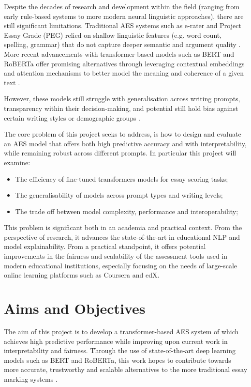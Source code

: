 \documentclass[10pt]{report}
\begin{document}
Despite the decades of research and development within the field (ranging from early rule-based systems to more modern neural linguistic approaches), there are still significant limitations\parencite{dikli2006}. Traditional AES systems such as e-rater \parencite{e-rater2006} and Project Essay Grade (PEG) \parencite{page2003} relied on shallow linguistic features (e.g. word count, spelling, grammar) that do not capture deeper semantic and argument quality \parencite{dikli2006}. More recent advancements with transformer-based models such as BERT \parencite{devlin2019bert} and RoBERTa \parencite{liu2019roberta} offer promising alternatives through leveraging contextual embeddings and attention mechanisms to better model the meaning and coherence of a given text \parencite{devlin2019bert}. 

However, these models still struggle with generalisation across writing prompts, transparency within their decision-making, and potential still hold bias against certain writing styles or demographic groups \cite{beigman2021limitations}.

The core problem of this project seeks to address, is how to design and evaluate an AES model that offers both high predictive accuracy and with interpretability, while remaining robust across different prompts. In particular this project will examine:

\begin{itemize}
    \item The efficiency of fine-tuned transformers models for essay scoring tasks;
    \item The generalisability of models across prompt types and writing levels;
    \item The trade off between model complexity, performance and interoperability;
\end{itemize}

This problem is significant both in an academia and practical context. From the perspective of research, it advances the state-of-the-art in educational NLP and model explainability. From a practical standpoint, it offers potential improvements in the fairness and scalability of the assessment tools used in modern educational institutions, especially focusing on the needs of large-scale online learning platforms such as Coursera and edX.


\section{Aims and Objectives}
The aim of this project is to develop a transformer-based AES system of which achieves high predictive performance while improving upon current work in interpretability and fairness. Through the use of state-of-the-art deep learning models such as BERT and RoBERTa, this work hopes to contribute towards more accurate, trustworthy and scalable alternatives to the more traditional essay marking systems \parencite{devlin2019bert}.
\end{document}
